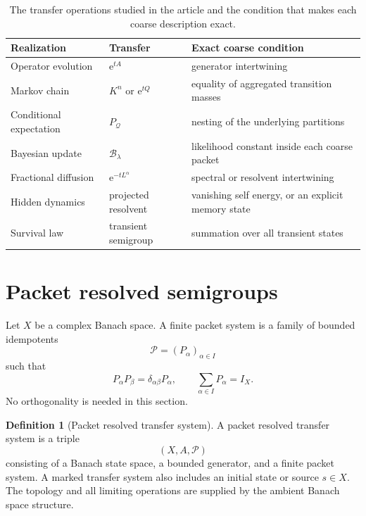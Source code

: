 \documentclass{aomart}
\theoremstyle{definition}
\newtheorem{definition}[definition]{Definition}
\theoremstyle{remark}
\newcommand{\Pcal}{\mathcal P}
\newcommand{\Bcal}{\mathcal B}
\newcommand{\e}{\mathrm e}
\begin{document}
\begin{table}[t]
\centering
\small
\begin{tabular}{>{\raggedright\arraybackslash}p{}>{\raggedright\arraybackslash}p{}>{\raggedright\arraybackslash}p{}}
\toprule
Realization & Transfer & Exact coarse condition \\
\midrule
Operator evolution & $\e^{tA}$ & generator intertwining \\
Markov chain & $K^n$ or $\e^{tQ}$ & equality of aggregated transition masses \\
Conditional expectation & $P_{\mathcal Q}$ & nesting of the underlying partitions \\
Bayesian update & $\Bcal_\lambda$ & likelihood constant inside each coarse packet \\
Fractional diffusion & $\e^{-tL^\alpha}$ & spectral or resolvent intertwining \\
Hidden dynamics & projected resolvent & vanishing self energy, or an explicit memory state \\
Survival law & transient semigroup & summation over all transient states \\
\bottomrule
\end{tabular}
\caption{The transfer operations studied in the article and the condition that makes each coarse description exact.}
\label{tab:transfer_dictionary}
\end{table}

\section{Packet resolved semigroups}\label{sec:packet_semigroups}

Let \(X\) be a complex Banach space. A finite packet system is a family of bounded idempotents
\[
\Pcal=(P_\alpha)_{\alpha\in I}
\]
such that
\[
P_\alpha P_\beta=\delta_{\alpha\beta}P_\alpha,
\qquad
\sum_{\alpha\in I}P_\alpha=I_X.
\]
No orthogonality is needed in this section.

\begin{definition}[Packet resolved transfer system]
A packet resolved transfer system is a triple
\[
(X,A,\Pcal)
\]
consisting of a Banach state space, a bounded generator, and a finite packet system. A marked transfer system also includes an initial state or source $s\in X$. The topology and all limiting operations are supplied by the ambient Banach space structure.
\end{definition}
\end{document}
